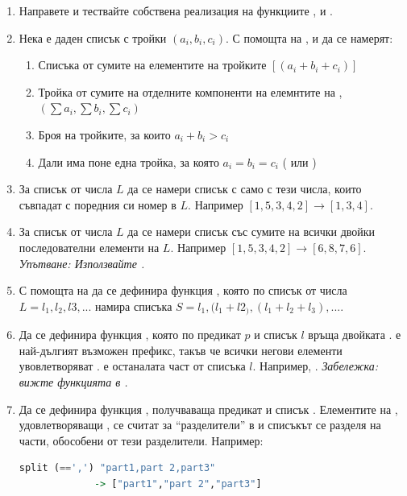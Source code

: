 \begin{enumerate}[resume]
	\item Направете и тествайте собствена реализация на функциите ,  и .
	\item Нека е даден списък  с тройки $(a_i,b_i,c_i)$. С помощта на ,  и  да се намерят:
	
	\begin{enumerate}[label=\alph*)]
		\item Списъка от сумите на елементите на тройките $[(a_i+b_i+c_i)]$
		\item Тройка от сумите на отделните компоненти на елемнтите на , $(\sum a_i,\sum b_i, \sum c_i)$
		\item Броя на тройките, за които $a_i+b_i>c_i$
		\item Дали има поне една тройка, за която $a_i=b_i=c_i$ ( или )
	\end{enumerate}
	\item За списък от числа $L$ да се намери списък с само с тези числа, които съвпадат с поредния си номер в $L$. Например $[1,5,3,4,2] \rightarrow [1,3,4]$.

	\item За списък от числа $L$ да се намери списък със сумите на всички двойки последователни елементи на $L$. Например $[1,5,3,4,2] \rightarrow [6,8,7,6]$. \emph{Упътване: Използвайте .}
	
	\item С помощта на  да се дефинира функция , която по списък от числа $L=l_1,l_2,l3,...$ намира списъка $S=l_1,(l_1+l2_),(l_1+l_2+l_3),...$. 
	
	\item Да се дефинира функция , която по предикат $p$ и списък $l$ връща двойката .  е най-дългият възможен префикс, такъв че всички негови елементи увовлетворяват .  е останалата част от списъка $l$. Например, . \emph{Забележка: вижте функцията   в .}
	
	\item \label{zad:split}Да се дефинира функция , получваваща предикат  и списък . Елементите на , удовлетворяващи , се считат за ``разделители'' в  и списъкът се разделя на части, обособени от тези разделители. Например:
\begin{lstlisting}[basicstyle=\small,language=Haskell]
split (==',') "part1,part 2,part3" 
             -> ["part1","part 2","part3"]
\end{lstlisting}
\end{enumerate}

